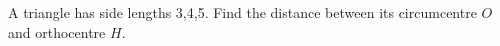 A triangle has side lengths 3,4,5. Find the distance between its circumcentre $O$ and orthocentre $H$.
